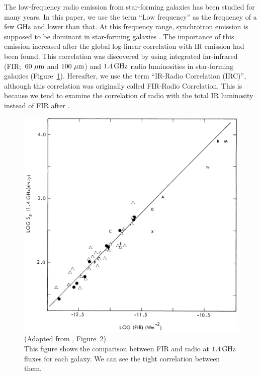 The low-frequency radio emission from star-forming galaxies has been studied for many years.
In this paper, we use the term ``Low frequency'' as the frequency of a few $\mathrm{GHz}$ and lower than that.
At this frequency range, synchrotron emission is supposed to be dominant in star-forming galaxies \citep{Condon1992a}.
The importance of this emission increased after the global log-linear correlation with IR emission had been found.
This correlation was discovered by \citet{Helou1985} using integrated far-infrared (FIR;~$60\,\,\mathrm{\mu m}$ and $100\,\,\mathrm{\mu m}$) and $1.4\,\mathrm{GHz}$ radio luminosities in star-forming galaxies (Figure~\ref{fig:Helou1985_figure2}).
Hereafter, we use the term ``IR-Radio Correlation (IRC)'', although this correlation was originally called FIR-Radio Correlation.
This is because we tend to examine the correlation of radio with the total IR luminosity instead of FIR after \citet{Bell2003}.

\begin{figure}[htbp]
	\centering
	\includegraphics[width=.6\linewidth]{Chapter_1/Figures/Helou1985_Figure2.png}
    \caption[Adapted from \citet{Helou1985} (Figure~2)]{\label{fig:Helou1985_figure2}
        (Adapted from \citet{Helou1985}, Figure~2)\\
        This figure shows the comparison between FIR and radio at $1.4\,\mathrm{GHz}$ fluxes for each galaxy.
        We can see the tight correlation between them.
    }
\end{figure}


